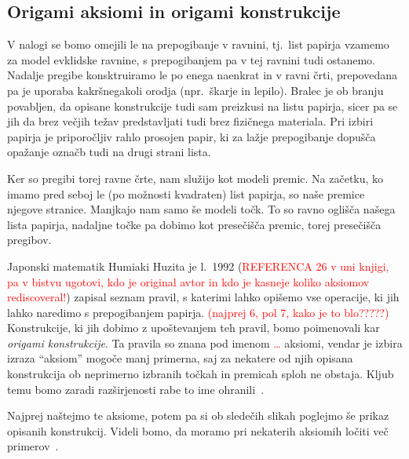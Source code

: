 \subsection{Origami aksiomi in origami konstrukcije}

V nalogi se bomo omejili le na prepogibanje v ravnini, tj.\ list papirja vzamemo za model evklidske ravnine, s prepogibanjem pa v tej ravnini tudi ostanemo. Nadalje pregibe konsktruiramo le po enega naenkrat in v ravni črti, prepovedana pa je uporaba kakršnegakoli orodja (npr.\ škarje in lepilo).  Bralec je ob branju povabljen, da opisane konstrukcije tudi sam preizkusi na listu papirja, sicer pa se jih da brez večjih težav predstavljati tudi brez fizičnega materiala. Pri izbiri papirja je priporočljiv rahlo prosojen papir, ki za lažje prepogibanje dopušča opažanje označb tudi na drugi strani lista.

Ker so pregibi torej ravne črte, nam služijo kot modeli premic. Na začetku, ko imamo pred seboj le (po možnosti kvadraten) list papirja, so naše premice njegove stranice. Manjkajo nam samo še modeli točk. To so ravno oglišča našega lista papirja, nadaljne točke pa dobimo kot presečišča premic, torej presečišča pregibov.

Japonski matematik Humiaki Huzita je l.\ 1992 (\textcolor{red}{REFERENCA 26 v uni knjigi, pa v bistvu ugotovi, kdo je original avtor in kdo je kasneje koliko aksiomov rediscoveral!}) zapisal seznam pravil, s katerimi lahko opišemo vse operacije, ki jih lahko naredimo s prepogibanjem papirja. \textcolor{red}{(najprej 6, pol 7, kako je to blo?????)} Konstrukcije, ki jih dobimo z upoštevanjem teh pravil, bomo poimenovali kar \emph{origami konstrukcije}. Ta pravila so znana pod imenom \textcolor{red}{\ldots} aksiomi, vendar je izbira izraza ``aksiom'' mogoče manj primerna, saj za nekatere od njih opisana konstrukcija ob neprimerno izbranih točkah in premicah sploh ne obstaja. Kljub temu bomo zaradi razširjenosti rabe to ime ohranili~\cite[str.\ 7]{zore2022}.

Najprej naštejmo te aksiome, potem pa si ob sledečih slikah poglejmo še prikaz opisanih konstrukcij. Videli bomo, da moramo pri nekaterih aksiomih ločiti več primerov~\cite{michael2005, zore2022}.

\renewcommand{\theaksiom}{O\arabic{aksiom}}

